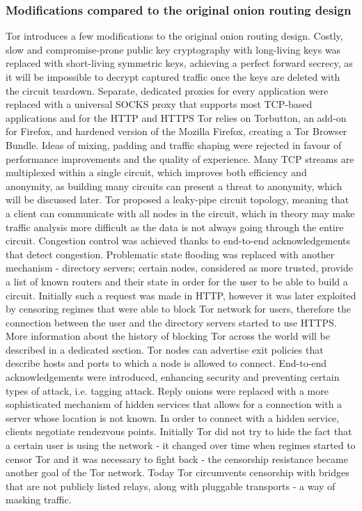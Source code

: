 \subsubsection{Modifications compared to the original onion routing design}
Tor introduces a few modifications to the original onion routing design.
Costly, slow and compromise-prone public key cryptography with long-living keys was replaced with short-living symmetric keys, achieving a perfect forward secrecy, as it will be impossible to decrypt captured traffic once the keys are deleted with the circuit teardown. Separate, dedicated proxies for every application were replaced with a universal SOCKS proxy that supports most TCP-based applications and for the HTTP and HTTPS Tor relies on Torbutton, an add-on for Firefox, and hardened version of the Mozilla Firefox, creating a Tor Browser Bundle. Ideas of mixing, padding and traffic shaping were rejected in favour of performance improvements and the quality of experience. Many TCP streams are multiplexed within a single circuit, which improves both efficiency and anonymity, as building many circuits can present a threat to anonymity, which will be discussed later. Tor proposed a leaky-pipe circuit topology, meaning that a client can communicate with all nodes in the circuit, which in theory may make traffic analysis more difficult as the data is not always going through the entire circuit. Congestion control was achieved thanks to end-to-end acknowledgements that detect congestion. Problematic state flooding was replaced with another mechanism - directory servers; certain nodes, considered as more trusted, provide a list of known routers and their state in order for the user to be able to build a circuit. Initially such a request was made in HTTP, however it was later exploited by censoring regimes that were able to block Tor network for users, therefore the connection between the user and the directory servers started to use HTTPS. More information about the history of blocking Tor across the world will be described in a dedicated section. 
Tor nodes can advertise exit policies that describe hosts and ports to which a node is allowed to connect. End-to-end acknowledgements were introduced, enhancing security and preventing certain types of attack, i.e. tagging attack. Reply onions were replaced with a more sophisticated mechanism of hidden services that allows for a connection with a server whose location is not known. In order to connect with a hidden service, clients negotiate rendezvous points.
Initially Tor did not try to hide the fact that a certain user is using the network - it changed over time when regimes started to censor Tor and it was necessary to fight back - the censorship resistance became another goal of the Tor network. Today Tor circumvents censorship with bridges that are not publicly listed relays, along with pluggable transports - a way of masking traffic.

